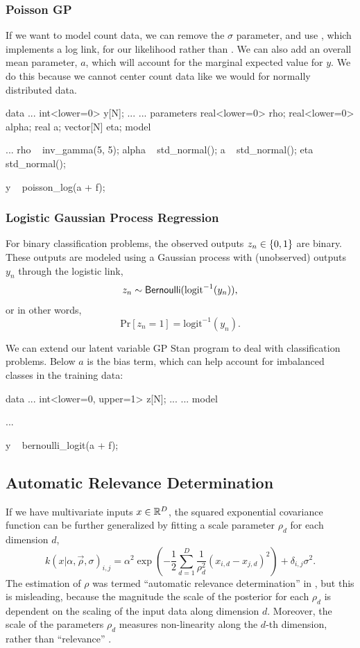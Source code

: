 \subsubsection{Poisson GP}

If we want to model count data, we can remove the $\sigma$ parameter, and use
, which implements a log link, for our likelihood rather
than . We can also add an overall mean parameter, $a$, which
will account for the marginal expected value for $y$. We do this because we
cannot center count data like we would for normally distributed data.

%
\begin{stancode}
data {
...
  int<lower=0> y[N];
...
}
...
parameters {
  real<lower=0> rho;
  real<lower=0> alpha;
  real a;
  vector[N] eta;
}
model {
...
  rho ~ inv_gamma(5, 5);
  alpha ~ std_normal();
  a ~ std_normal();
  eta ~ std_normal();

  y ~ poisson_log(a + f);
}
\end{stancode}
%

\subsubsection{Logistic Gaussian Process Regression}

For binary classification problems, the observed outputs $z_n \in
\{ 0,1 \}$ are binary.  These outputs are modeled using a Gaussian
process with (unobserved) outputs $y_n$ through the logistic link,
\[
z_n \sim \mbox{\sf Bernoulli}(\mbox{logit}^{-1}(y_n)),
\]
or in other words,
\[
\mbox{Pr}[z_n = 1] = \mbox{logit}^{-1}(y_n).
\]

We can extend our latent variable GP Stan program to deal with classification
problems. Below $a$ is the bias term, which can help account for imbalanced
classes in the training data:

%
\begin{stancode}
data {
...
  int<lower=0, upper=1> z[N];
...
}
...
model {
...

  y ~ bernoulli_logit(a + f);
}
\end{stancode}
%

\subsection{Automatic Relevance Determination}

If we have multivariate inputs $x \in \mathbb{R}^D$, the squared exponential
covariance function can be further generalized by fitting a scale
parameter $\rho_d$ for each dimension $d$,
\[
  k(x | \alpha, \vec{\rho}, \sigma)_{i, j} = \alpha^2 \exp
\left(-\dfrac{1}{2}
\sum_{d=1}^D \dfrac{1}{\rho_d^2} (x_{i,d} - x_{j,d})^2
\right)
+ \delta_{i, j}\sigma^2.
\]
The estimation of $\rho$ was termed ``automatic relevance determination'' in
\citep{Neal:1996}, but this is misleading, because the magnitude the scale of
the posterior for each $\rho_d$ is dependent on the scaling of the input data
along dimension $d$. Moreover, the scale of the parameters $\rho_d$ measures
non-linearity along the $d$-th dimension, rather than ``relevance''
\citep{PiironenVehtari:2016}.

